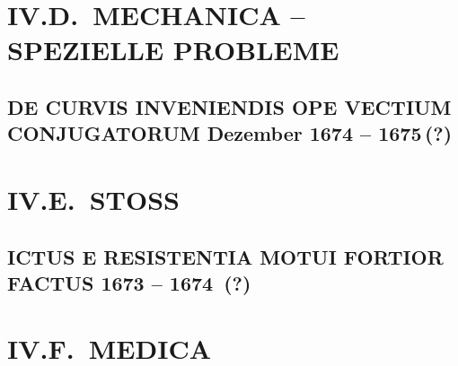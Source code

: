\documentclass[%
fontsize=10pt,
]{scrbook}
\renewcommand*{\chapterheadstartvskip}{\vspace*{19.5ex}}	%
\renewcommand*{\chapterheadstartvskip}{\vspace*{0pt}}
\DeclareRobustCommand{\bracks}[1]{%
\textup{\lbrack}#1\textup{\rbrack}}
\begin{document}
\part[tocentry={IV.D.~MECHANICA -- SPEZIELLE PROBLEME (Zu Bd VIII, 2)},
head={IV.D.~MECHANICA -- SPEZIELLE PROBLEME}]%
{IV.D.~MECHANICA -- SPEZIELLE PROBLEME }	%
\renewcommand*{\chapterheadstartvskip}{\vspace*{0pt}}        %



\chapter[tocentry={De curvis inveniendis ope vectium conjugatorum
\enskip \bracks{Dezember 1674 -- 1675\,(?)}},
head={De curvis inveniendis ope vectium conjugatorum}]%
{\MakeUppercase{De curvis inveniendis ope vectium conjugatorum}
\newline \bracks{Dezember 1674 -- 1675\,(?)}}
\label{Cc2_847-2}







\part[tocentry={IV.E.~STOSS (Zu Bd VIII, 2)},
head={IV.E.~STOSS}]%
{IV.E.~STOSS }	%
\renewcommand*{\chapterheadstartvskip}{\vspace*{0pt}}        %


\chapter[tocentry={Ictus e resistentia motui fortior factus
\enskip\bracks{1673 -- 1674~(?)}}, %
head={Ictus e resistentia motui fortior factus}]%
{\MakeUppercase{Ictus e resistentia motui fortior factus}
\newline\bracks{1673 -- 1674~(?)}} %
\label{Cc2-0481}







\part[tocentry={IV.F.~MEDICA (Zu Bd VIII, 2)},
head={IV.F.~MEDICA}]%
{IV.F.~MEDICA }	%
\renewcommand*{\chapterheadstartvskip}{\vspace*{0pt}}        %
\end{document}
